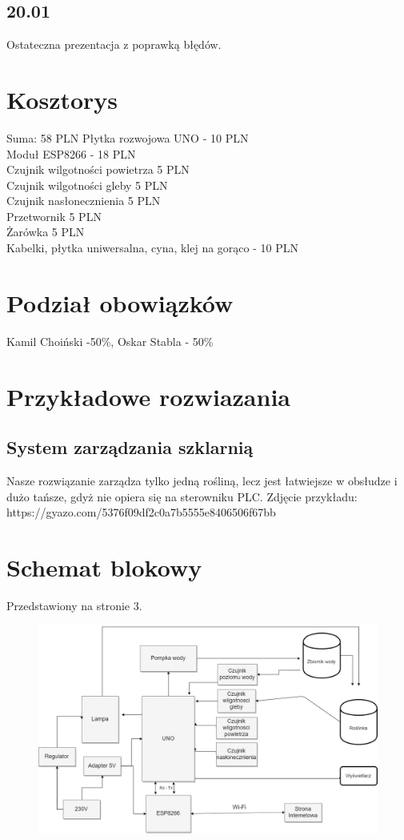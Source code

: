 \documentclass{article}
\begin{document}
\subsection{20.01}
Ostateczna prezentacja z poprawką błędów.
\section{Kosztorys}
Suma: 58 PLN
\newline
Płytka rozwojowa UNO - 10 PLN  \\
Moduł ESP8266 - 18 PLN \\
Czujnik wilgotności powietrza 5 PLN  \\
Czujnik wilgotności gleby 5 PLN  \\
Czujnik nasłonecznienia 5 PLN  \\
Przetwornik 5 PLN  \\
Żarówka 5  PLN  \\
Kabelki, płytka uniwersalna, cyna, klej na gorąco - 10 PLN  \\


\section{Podział obowiązków}
Kamil Choiński -50\%,  Oskar Stabla - 50\%


\section{Przykładowe rozwiazania}
\subsection{System zarządzania szklarnią}
Nasze rozwiązanie zarządza tylko jedną rośliną, lecz jest łatwiejsze w obsłudze i dużo tańsze, gdyż nie opiera się na sterowniku PLC.
Zdjęcie przykładu: https://gyazo.com/5376f09df2c0a7b5555e8406506f67bb

\section{Schemat blokowy}
Przedstawiony na stronie 3.
\begin{figure}
\centering
\includegraphics[scale=0.4]{schemat_blokowy}
\end{figure}
\end{document}
